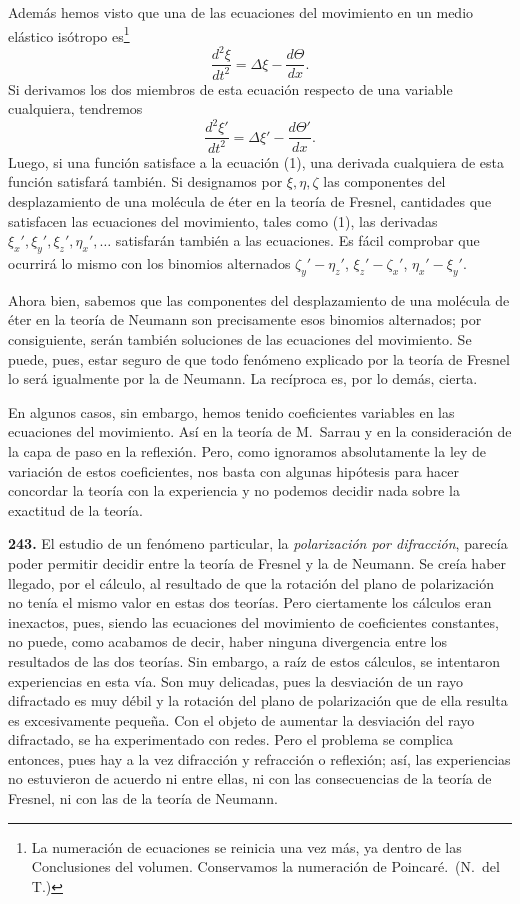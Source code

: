 Además hemos visto que una de las ecuaciones del movimiento en un medio
elástico isótropo es\footnote{La numeración de ecuaciones se reinicia una
vez más, ya dentro de las Conclusiones del volumen. Conservamos la
numeración de Poincaré.~(N.~del T.)}
\setcounter{equation}{0}
\begin{equation}
\frac{d^2\xi}{dt^2} = \Delta\xi - \frac{d\Theta}{dx}.
\end{equation}
Si derivamos los dos miembros de esta ecuación respecto de una variable
cualquiera, tendremos
\[
\frac{d^2\xi'}{dt^2} = \Delta\xi' - \frac{d\Theta'}{dx}.
\]
Luego, si una función satisface a la ecuación (1), una derivada cualquiera
de esta función satisfará también. Si designamos por $\xi, \eta, \zeta$
las componentes del desplazamiento de una molécula de éter en la teoría de
Fresnel, cantidades que satisfacen las ecuaciones del movimiento, tales
como (1), las derivadas $\xi_x', \xi_y', \xi_z', \eta_x', \ldots$
satisfarán también a las ecuaciones. Es fácil comprobar que ocurrirá lo
mismo con los binomios alternados $\zeta_y'-\eta_z'$, $\xi_z'-\zeta_x'$,
$\eta_x'-\xi_y'$.

Ahora bien, sabemos que las componentes del desplazamiento de una molécula
de éter en la teoría de Neumann son precisamente esos binomios alternados;
por consiguiente, serán también soluciones de las ecuaciones del
movimiento. Se puede, pues, estar seguro de que todo fenómeno explicado por
la teoría de Fresnel lo será igualmente por la de Neumann. La recíproca es,
por lo demás, cierta.

En algunos casos, sin embargo, hemos tenido coeficientes variables en las
ecuaciones del movimiento. Así en la teoría de M.~Sarrau y en la
consideración de la capa de paso en la reflexión. Pero, como ignoramos
absolutamente la ley de variación de estos coeficientes, nos basta con
algunas hipótesis para hacer concordar la teoría con la experiencia y no
podemos decidir nada sobre la exactitud de la teoría.

\noindent\textbf{243.} El estudio de un fenómeno particular, la
\emph{polarización por difracción}, parecía poder permitir decidir entre
la teoría de Fresnel y la de Neumann. Se creía haber llegado, por el
cálculo, al resultado de que la rotación del plano de polarización no
tenía el mismo valor en estas dos teorías. Pero ciertamente los cálculos
eran inexactos, pues, siendo las ecuaciones del movimiento de coeficientes
constantes, no puede, como acabamos de decir, haber ninguna divergencia
entre los resultados de las dos teorías. Sin embargo, a raíz de estos
cálculos, se intentaron experiencias en esta vía. Son muy delicadas, pues
la desviación de un rayo difractado es muy débil y la rotación del plano de
polarización que de ella resulta es excesivamente pequeña. Con el objeto de
aumentar la desviación del rayo difractado, se ha experimentado con redes.
Pero el problema se complica entonces, pues hay a la vez difracción y
refracción o reflexión; así, las experiencias no estuvieron de acuerdo
ni entre ellas, ni con las consecuencias de la teoría de Fresnel, ni con
las de la teoría de Neumann.

